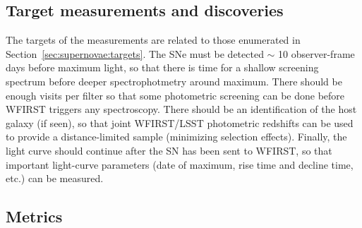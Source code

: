 
\subsection{Target measurements and discoveries}
\label{sec:\secname:targets}

%


The targets of the measurements are related to those enumerated in Section~\ref{sec:supernovae:targets}. The SNe must be detected $\sim$ 10 observer-frame days before maximum light, so that there is time for a shallow screening spectrum before deeper spectrophotmetry around maximum. There should be enough visits per filter so that some photometric screening can be done before WFIRST triggers any spectroscopy. There should be an identification of the host galaxy (if seen), so that joint WFIRST/LSST photometric redshifts can be used to provide a distance-limited sample (minimizing selection effects). Finally, the light curve should continue after the SN has been sent to WFIRST, so that important light-curve parameters (date of maximum, rise time and decline time, etc.) can be measured.




\subsection{Metrics}
\label{sec:\secname:metrics}

